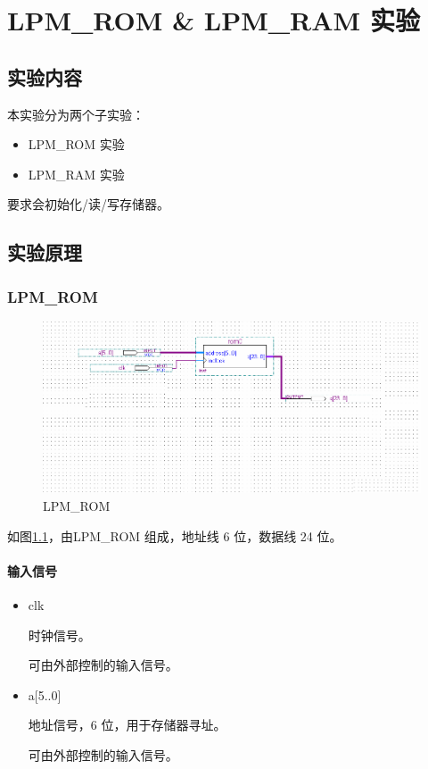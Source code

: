 \chapter{LPM\_ROM \& LPM\_RAM 实验}
\section{实验内容}

本实验分为两个子实验：

\begin{itemize}
    \item LPM\_ROM 实验
    \item LPM\_RAM 实验
\end{itemize}

要求会初始化/读/写存储器。

\section{实验原理}

\subsection{LPM\_ROM}

\begin{figure}[H]
\centering
\includegraphics[width=\textwidth]{images/prin2_1.png}
\caption{LPM\_ROM}
\label{fig:prin2_1}
\end{figure}

如图\ref{fig:prin2_1}，由LPM\_ROM 组成，地址线 6 位，数据线 24 位。

\subsubsection{输入信号}

\begin{itemize}
    \item clk
    
    时钟信号。

    可由外部控制的输入信号。
    
    \item a[5..0]
    
    地址信号，6 位，用于存储器寻址。
    
    可由外部控制的输入信号。
    
\end{itemize} 

